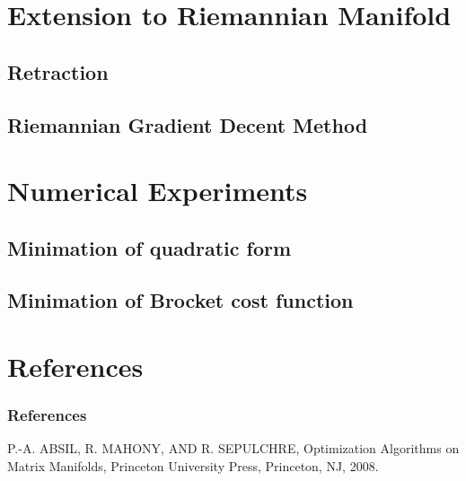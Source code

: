 \documentclass[dvipdfmx,11pt]{beamer}		%
\begin{document}
    
   
    \section{Extension to Riemannian Manifold}
    \subsection{Retraction}
    \subsection{Riemannian Gradient Decent Method}
    \section{Numerical Experiments}
    \subsection{Minimation of quadratic form}
    \subsection{Minimation of Brocket cost function}

    \section*{References}
    \begin{frame}\frametitle{References}
        \begin{thebibliography}{9}
            \beamertemplatetextbibitems
             P.-A. ABSIL, R. MAHONY, AND R. SEPULCHRE, Optimization Algorithms on Matrix Manifolds, 
                       Princeton University Press, Princeton, NJ, 2008.
	    \end{thebibliography}
    \end{frame}
\end{document}
